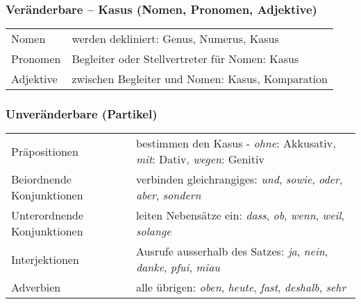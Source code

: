 \subsubsection{Veränderbare -- Kasus (Nomen, Pronomen, Adjektive)}
\settowidth{\MyLenA}{Adjektive~~}
\begin{tabular}{@{}p{\the\MyLenA}%
				@{}p{\linewidth-\the\MyLenA}}
Nomen 	& werden dekliniert: Genus, Numerus, Kasus\\
Pronomen	& Begleiter oder Stellvertreter für Nomen: Kasus\\
Adjektive	& zwischen Begleiter und Nomen: Kasus, Komparation\\
\end{tabular}

\subsubsection{Unveränderbare (Partikel)}
\settowidth{\MyLenA}{Unterordnende Konjunktionen~~}
\begin{tabular}{@{}p{\the\MyLenA}%
				@{}p{\linewidth-\the\MyLenA}}
	Präpositionen & bestimmen den Kasus - \textit{ohne}: Akkusativ, \textit{mit}: Dativ, \textit{wegen}: Genitiv\\
	Beiordnende Konjunktionen & verbinden gleichrangiges: \textit{und}, \textit{sowie}, \textit{oder}, \textit{aber}, \textit{sondern}\\
	Unterordnende Konjunktionen & leiten Nebensätze ein: \textit{dass}, \textit{ob}, \textit{wenn}, \textit{weil}, \textit{solange}\\
	Interjektionen & Ausrufe ausserhalb des Satzes: \textit{ja}, \textit{nein}, \textit{danke}, \textit{pfui}, \textit{miau}\\
	Adverbien & alle übrigen: \textit{oben}, \textit{heute}, \textit{fast}, \textit{deshalb}, \textit{sehr}\\
\end{tabular}







